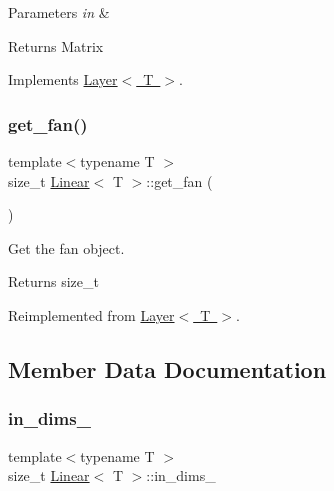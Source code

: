 \begin{DoxyParams}{Parameters}
{\em in} & \\
\hline
\end{DoxyParams}
\begin{DoxyReturn}{Returns}
Matrix 
\end{DoxyReturn}


Implements \mbox{\hyperlink{class_layer_ab15b665c86974b1cf1d7ba4e309cb0e5}{Layer$<$ T $>$}}.

\mbox{\label{class_linear_a753a7cb02a0b18e8922d23db905eb534}} 
\subsubsection{\texorpdfstring{get\_fan()}{get\_fan()}}
{\footnotesize\ttfamily template$<$typename T $>$ \\
size\+\_\+t \mbox{\hyperlink{class_linear}{Linear}}$<$ T $>$\+::get\+\_\+fan (\begin{DoxyParamCaption}{ }\end{DoxyParamCaption})\hspace{0.3cm}{\ttfamily [virtual]}}



Get the fan object. 

\begin{DoxyReturn}{Returns}
size\+\_\+t 
\end{DoxyReturn}


Reimplemented from \mbox{\hyperlink{class_layer_a43681206a2ef690667c41423b6b6f20b}{Layer$<$ T $>$}}.



\subsection{Member Data Documentation}
\mbox{\label{class_linear_ae15dad7b24bbc705da10f6896188ab13}} 
\subsubsection{\texorpdfstring{in\_dims\_}{in\_dims\_}}
{\footnotesize\ttfamily template$<$typename T $>$ \\
size\+\_\+t \mbox{\hyperlink{class_linear}{Linear}}$<$ T $>$\+::in\+\_\+dims\+\_\+\hspace{0.3cm}{\ttfamily [protected]}}

